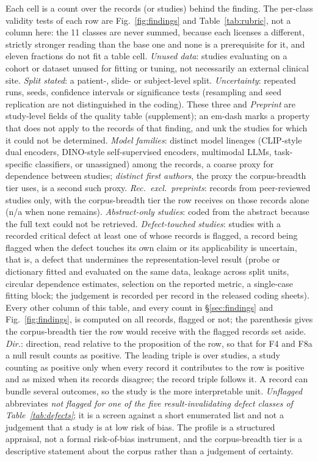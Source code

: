 \noindent\small Each cell is a count over the records (or studies) behind the finding. The per-class validity tests of each row are Fig.~\ref{fig:findings} and Table~\ref{tab:rubric}, not a column here: the 11 classes are never summed, because each licenses a different, strictly stronger reading than the base one and none is a prerequisite for it, and eleven fractions do not fit a table cell. \emph{Unused data}: studies evaluating on a cohort or dataset unused for fitting or tuning, not necessarily an external clinical site. \emph{Split stated}: a patient-, slide- or subject-level split. \emph{Uncertainty}: repeated runs, seeds, confidence intervals or significance tests (resampling and seed replication are not distinguished in the coding). These three and \emph{Preprint} are study-level fields of the quality table (supplement); an em-dash marks a property that does not apply to the records of that finding, and unk the studies for which it could not be determined. \emph{Model families}: distinct model lineages (CLIP-style dual encoders, DINO-style self-supervised encoders, multimodal LLMs, task-specific classifiers, or unassigned) among the records, a coarse proxy for dependence between studies; \emph{distinct first authors}, the proxy the corpus-breadth tier uses, is a second such proxy. \emph{Rec.\ excl.\ preprints}: records from peer-reviewed studies only, with the corpus-breadth tier the row receives on those records alone (n/a when none remains). \emph{Abstract-only studies}: coded from the abstract because the full text could not be retrieved. \emph{Defect-touched studies}: studies with a recorded critical defect at least one of whose records is flagged, a record being flagged when the defect touches its own claim or its applicability is uncertain, that is, a defect that undermines the representation-level result (probe or dictionary fitted and evaluated on the same data, leakage across split units, circular dependence estimates, selection on the reported metric, a single-case fitting block; the judgement is recorded per record in the released coding sheets). Every other column of this table, and every count in \S\ref{sec:findings} and Fig.~\ref{fig:findings}, is computed on all records, flagged or not; the parenthesis gives the corpus-breadth tier the row would receive with the flagged records set aside. \emph{Dir.}: direction, read relative to the proposition of the row, so that for F4 and F8a a null result counts as positive. The leading triple is over studies, a study counting as positive only when every record it contributes to the row is positive and as mixed when its records disagree; the record triple follows it. A record can bundle several outcomes, so the study is the more interpretable unit. \emph{Unflagged} abbreviates \emph{not flagged for one of the five result-invalidating defect classes of Table~\ref{tab:defects}}; it is a screen against a short enumerated list and not a judgement that a study is at low risk of bias. The profile is a structured appraisal, not a formal risk-of-bias instrument, and the corpus-breadth tier is a descriptive statement about the corpus rather than a judgement of certainty.
